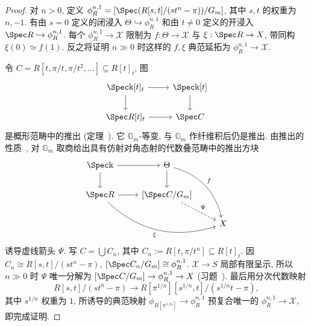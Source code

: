 \begin{proof}
对 $n>0$, 定义 $\phi_R^{n,1}=[\Spec(R[s,t]/(st^n-\pi))/\mathbb G_m]$, 其中 $s,t$ 的权重为 $n,-1$. 有由 $s=0$ 定义的闭浸入 $\Theta\hookrightarrow\phi_R^{n,1}$ 和由 $t\ne0$ 定义的开浸入 $\Spec R\hookrightarrow\phi_R^{n,1}$. 每个 $\phi_R^{n,1}\to\mathcal X$ 限制为 $f:\Theta\to\mathcal X$ 与 $\xi:\Spec R\to\mathcal X$, 带同构 $\xi(0)\simeq f(1)$. 反之将证明 $n\gg0$ 时这样的 $f,\xi$ 典范延拓为 $\phi_R^{n,1}\to\mathcal X$.

令 $C=R[t,\pi/t,\pi/t^2,\ldots]\subseteq R[t]_t$, 图
\[\begin{tikzcd}[ampersand replacement=\&]\Spec\Bbbk[t]_t\arrow[r]\arrow[d]\&\Spec\Bbbk[t]\arrow[d]\\\Spec R[t]_t\arrow[r]\&\Spec C\end{tikzcd}\]
是概形范畴中的推出 (定理~). 它 $\mathbb G_m$-等变, 与 $\mathbb G_m$ 作纤维积后仍是推出. 由推出的性质~, 对 $\mathbb G_m$ 取商给出具有仿射对角态射的代数叠范畴中的推出方块
\begin{align}\label{src:7.10.29}
\begin{tikzcd}[ampersand replacement=\&]\Spec\Bbbk\arrow[r]\arrow[d]\&\Theta\arrow[d]\arrow[ddr,bend left,"{f}"]\&\\\Spec R\arrow[r]\arrow[drr,bend right,"{\xi}"']\&{[\Spec C/\mathbb G_m]}\arrow[dr,dashed,"{\Psi}"]\&\\\&\&\mathcal X\end{tikzcd}
\end{align}
诱导虚线箭头 $\Psi$. 写 $C=\bigcup C_n$, 其中 $C_n:=R[t,\pi/t^n]\subseteq R[t]_t$. 因 $C_n\cong R[s,t]/(st^n-\pi)$, $[\Spec C_n/\mathbb G_m]\cong\phi_R^{n,1}$. $\mathcal X\to S$ 局部有限呈示, 所以 $n\gg0$ 时 $\Psi$ 唯一分解为 $[\Spec C/\mathbb G_m]\to\phi_R^{n,1}\to\mathcal X$ (习题~). 最后用分次代数映射
\[R[s,t]/(st^n-\pi)\to R[\pi^{1/n}][s^{1/n},t]/(s^{1/n}t-\pi),\]
其中 $s^{1/n}$ 权重为 $1$, 所诱导的典范映射 $\phi_{R[\pi^{1/n}]}\to\phi_R^{n,1}$ 预复合唯一的 $\phi_R^{n,1}\to\mathcal X$, 即完成证明.
\end{proof}
